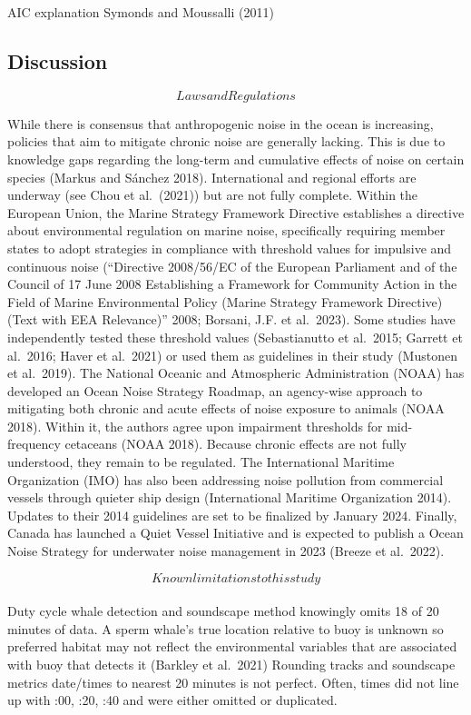 \documentclass[
]{article}
\begin{document}
AIC explanation Symonds and Moussalli (2011)

\hypertarget{discussion}{%
\subsection{Discussion}\label{discussion}}

\[Laws and Regulations\]

While there is consensus that anthropogenic noise in the ocean is
increasing, policies that aim to mitigate chronic noise are generally
lacking. This is due to knowledge gaps regarding the long-term and
cumulative effects of noise on certain species (Markus and Sánchez
2018). International and regional efforts are underway (see Chou et
al.~(2021)) but are not fully complete. Within the European Union, the
Marine Strategy Framework Directive establishes a directive about
environmental regulation on marine noise, specifically requiring member
states to adopt strategies in compliance with threshold values for
impulsive and continuous noise (``Directive 2008/56/EC of the European
Parliament and of the Council of 17 June 2008 Establishing a Framework
for Community Action in the Field of Marine Environmental Policy (Marine
Strategy Framework Directive) (Text with EEA Relevance)'' 2008; Borsani,
J.F. et al.~2023). Some studies have independently tested these
threshold values (Sebastianutto et al.~2015; Garrett et al.~2016; Haver
et al.~2021) or used them as guidelines in their study (Mustonen et
al.~2019). The National Oceanic and Atmospheric Administration (NOAA)
has developed an Ocean Noise Strategy Roadmap, an agency-wise approach
to mitigating both chronic and acute effects of noise exposure to
animals (NOAA 2018). Within it, the authors agree upon impairment
thresholds for mid-frequency cetaceans (NOAA 2018). Because chronic
effects are not fully understood, they remain to be regulated. The
International Maritime Organization (IMO) has also been addressing noise
pollution from commercial vessels through quieter ship design
(International Maritime Organization 2014). Updates to their 2014
guidelines are set to be finalized by January 2024. Finally, Canada has
launched a Quiet Vessel Initiative and is expected to publish a Ocean
Noise Strategy for underwater noise management in 2023 (Breeze et
al.~2022).

\[Known limitations to this study\]\\
Duty cycle whale detection and soundscape method knowingly omits 18 of
20 minutes of data. A sperm whale's true location relative to buoy is
unknown so preferred habitat may not reflect the environmental variables
that are associated with buoy that detects it (Barkley et al.~2021)
Rounding tracks and soundscape metrics date/times to nearest 20 minutes
is not perfect. Often, times did not line up with :00, :20, :40 and were
either omitted or duplicated.
\end{document}
